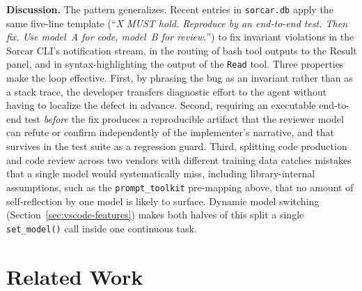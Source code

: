 \documentclass{article}
\begin{document}
\medskip
\noindent\textbf{Discussion.} The pattern generalizes.  Recent entries in \texttt{sorcar.db} apply the same five-line template (``\emph{X MUST hold. Reproduce by an end-to-end test. Then fix. Use model~A for code, model~B for review.}'') to fix invariant violations in the Sorcar CLI's notification stream, in the routing of bash tool outputs to the Result panel, and in syntax-highlighting the output of the \texttt{Read} tool.  Three properties make the loop effective.  First, by phrasing the bug as an invariant rather than as a stack trace, the developer transfers diagnostic effort to the agent without having to localize the defect in advance.  Second, requiring an executable end-to-end test \emph{before} the fix produces a reproducible artifact that the reviewer model can refute or confirm independently of the implementer's narrative, and that survives in the test suite as a regression guard.  Third, splitting code production and code review across two vendors with different training data catches mistakes that a single model would systematically miss, including library-internal assumptions, such as the \texttt{prompt\_toolkit} pre-mapping above, that no amount of self-reflection by one model is likely to surface.  Dynamic model switching (Section~\ref{sec:vscode-features}) makes both halves of this split a single \texttt{set\_model()} call inside one continuous task.

\section{Related Work}
\label{sec:related}
\end{document}
